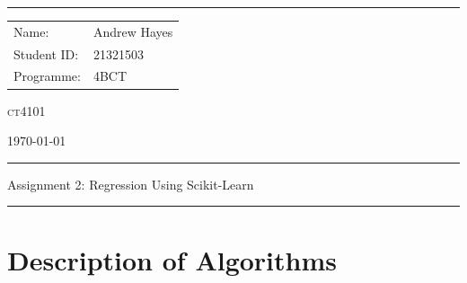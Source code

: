 \documentclass[a4paper]{article}
\begin{document}
\hrule \medskip
\begin{minipage}{0.295\textwidth} 
    \vfill
    \raggedright
    \footnotesize 
    \begin{tabular}{@{}l l} %
        Name: & Andrew Hayes \\
        Student ID: & 21321503 \\
        Programme: & 4BCT \\
    \end{tabular}
    \vfill
\end{minipage}
\begin{minipage}{0.4\textwidth} 
    \centering 
    \LARGE 
    \vfill
    \textsc{ct4101}
    \vfill
\end{minipage}
\begin{minipage}{0.295\textwidth} 
    \raggedleft
    \vfill
    \today
    \vfill
\end{minipage}
\smallskip
\hrule 
\begin{center}
    \normalsize
    Assignment 2: Regression Using Scikit-Learn
\end{center}
\hrule

\section{Description of Algorithms}
\end{document}
